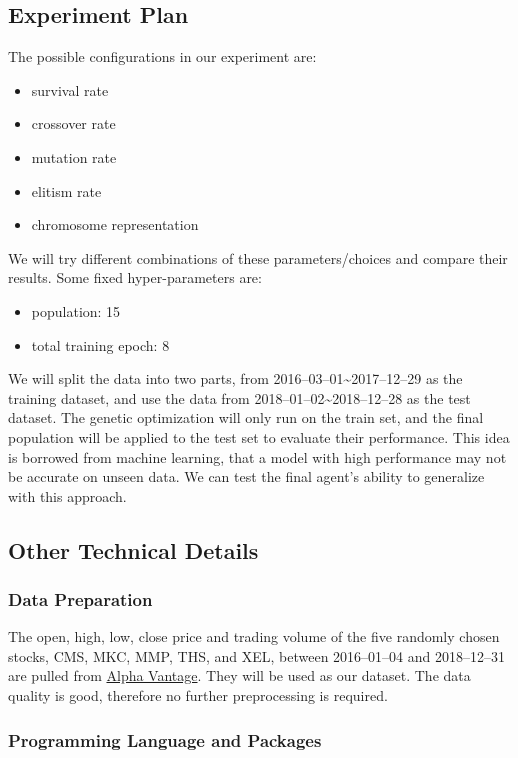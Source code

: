 \documentclass{article}
\begin{document}
\subsection{Experiment Plan}

The possible configurations in our experiment are:
\begin{itemize}
    \item survival rate
    \item crossover rate
    \item mutation rate
    \item elitism rate
    \item chromosome representation
\end{itemize}

We will try different combinations of these parameters/choices and compare their results.
Some fixed hyper-parameters are:
\begin{itemize}
    \item population: 15
    \item total training epoch: 8
\end{itemize}

We will split the data into two parts, from 2016--03--01\textasciitilde 2017--12--29 as the training dataset,
and use the data from 2018--01--02\textasciitilde 2018--12--28 as the test dataset.
The genetic optimization will only run on the train set,
and the final population will be applied to the test set to evaluate their performance.
This idea is borrowed from machine learning,
that a model with high performance may not be accurate on unseen data.
We can test the final agent's ability to generalize with this approach.

\subsection{Other Technical Details}

\subsubsection{Data Preparation}

The open, high, low, close price and trading volume
of the five randomly chosen stocks, CMS, MKC, MMP, THS, and XEL,
between 2016--01--04 and 2018--12--31 are pulled from \href{https://www.alphavantage.co/}{Alpha Vantage}.
They will be used as our dataset.
The data quality is good, therefore no further preprocessing is required.

\subsubsection{Programming Language and Packages}
\end{document}
